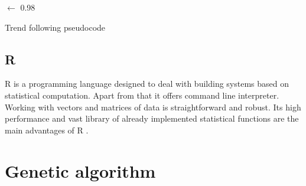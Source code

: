 \begin{algorithm}
 
 
  \BlankLine
  \maximumValueLoss $\leftarrow$ 0.98 \;
  
  \caption{Trend following pseudocode}\label{fig:tf_pseudo}
\end{algorithm}



\subsection{R}

R is a programming language designed to deal with building systems based on statistical computation.
Apart from that it offers command line interpreter.
Working with vectors and matrices of data is straightforward and robust.
Its high performance and vast library of already implemented statistical functions are the main advantages of R \cite{R}.    

\section{Genetic algorithm}
\label{sec:genAlgoImpl}

